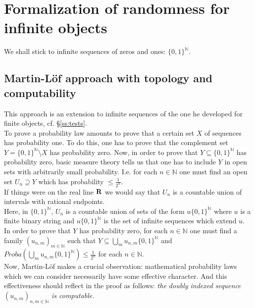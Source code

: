 \section{Formalization of randomness for infinite objects}
We shall stick to infinite sequences of zeros and ones:
$\{0,1\}^{\mathbb N}$.
\subsection{Martin-L\"of approach with topology and computability}
This approach is an extension to infinite sequences of the one
he developed for finite objects, cf. \S\ref{ss:tests}.
\medskip\\
To prove a probability law amounts to prove that
a certain set $X$ of sequences has probability one.
To do this, one has to prove that the complement set
$Y={\{0,1\}^{\mathbb N}} \setminus X$ has probability zero.
Now, in order to prove that $Y \subseteq {\{0,1\}^{\mathbb N}}$ has
probability zero, basic measure theory tells us that
one has to include $Y$ in open sets with
arbitrarily small probability.
I.e. for each $n\in {\mathbb N}$ one must find an open set
$U_{n}\supseteq Y$
which has probability $\leq \frac{1}{2^n}$.
\\
If things were on the real line ${\bf R}$
we would say that $U_{n}$ is a countable union of
intervals with rational endpoints.
\\
Here, in ${\{0,1\}^{\mathbb N}}$, $U_{n}$ is a
countable union of sets of the form
$u{\{0,1\}^{\mathbb N}}$ where $u$ is a finite binary
string and $u{\{0,1\}^{\mathbb N}}$ is the set of infinite sequences
which extend $u$.
\\
In order to prove that $Y$ has probability zero,
for each $n\in {\mathbb N}$ one must find a family
$(u_{n,m})_{m\in{\mathbb N}}$ such that
$Y\subseteq \bigcup_{m} u_{n,m}{\{0,1\}^{\mathbb N}}$
and $Proba(\bigcup_{m} u_{n,m}{\{0,1\}^{\mathbb N}})\leq \frac{1}{2^n}$
for each $n\in {\mathbb N}$.
\\
Now, Martin-L\"of makes a crucial observation:
mathematical probability laws which we can consider
necessarily have some effective character.
And this effectiveness should reflect in the proof
as follows:
{\em the doubly indexed sequence
$(u_{n,m})_{{n,m\in{\mathbb N}}}$ is computable.}

